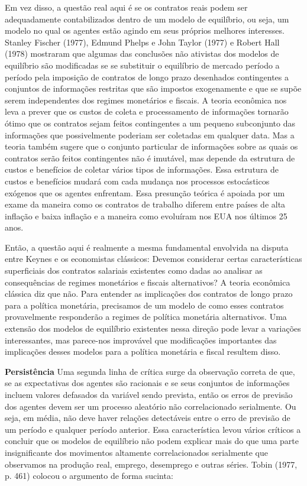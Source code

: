 \documentclass[a4paper,12pt]{article}[abntex2]
\begin{document}
Em vez disso, a questão real aqui é se os contratos reais podem ser adequadamente contabilizados dentro de um modelo de equilíbrio, ou seja, um modelo no qual os agentes estão agindo em seus próprios melhores interesses. Stanley Fischer (1977), Edmund Phelps e John Taylor (1977) e Robert Hall (1978) mostraram que algumas das conclusões não ativistas dos modelos de equilíbrio são modificadas se se substituir o equilíbrio de mercado período a período pela imposição de contratos de longo prazo desenhados contingentes a conjuntos de informações restritas que são impostos exogenamente e que se supõe serem independentes dos regimes monetários e fiscais. A teoria econômica nos leva a prever que os custos de coleta e processamento de informações tornarão ótimo que os contratos sejam feitos contingentes a um pequeno subconjunto das informações que possivelmente poderiam ser coletadas em qualquer data. Mas a teoria também sugere que o conjunto particular de informações sobre as quais os contratos serão feitos contingentes não é imutável, mas depende da estrutura de custos e benefícios de coletar vários tipos de informações. Essa estrutura de custos e benefícios mudará com cada mudança nos processos estocásticos exógenos que os agentes enfrentam. Essa presunção teórica é apoiada por um exame da maneira como os contratos de trabalho diferem entre países de alta inflação e baixa inflação e a maneira como evoluíram nos EUA nos últimos 25 anos.

Então, a questão aqui é realmente a mesma fundamental envolvida na disputa entre Keynes e os economistas clássicos: Devemos considerar certas características superficiais dos contratos salariais existentes como dadas ao analisar as consequências de regimes monetários e fiscais alternativos? A teoria econômica clássica diz que não. Para entender as implicações dos contratos de longo prazo para a política monetária, precisamos de um modelo de como esses contratos provavelmente responderão a regimes de política monetária alternativos. Uma extensão dos modelos de equilíbrio existentes nessa direção pode levar a variações interessantes, mas parece-nos improvável que modificações importantes das implicações desses modelos para a política monetária e fiscal resultem disso.

\textbf{Persistência}
Uma segunda linha de crítica surge da observação correta de que, se as expectativas dos agentes são racionais e se seus conjuntos de informações incluem valores defasados da variável sendo prevista, então os erros de previsão dos agentes devem ser um processo aleatório não correlacionado serialmente. Ou seja, em média, não deve haver relações detectáveis entre o erro de previsão de um período e qualquer período anterior. Essa característica levou vários críticos a concluir que os modelos de equilíbrio não podem explicar mais do que uma parte insignificante dos movimentos altamente correlacionados serialmente que observamos na produção real, emprego, desemprego e outras séries. Tobin (1977, p. 461) colocou o argumento de forma sucinta:
\end{document}
